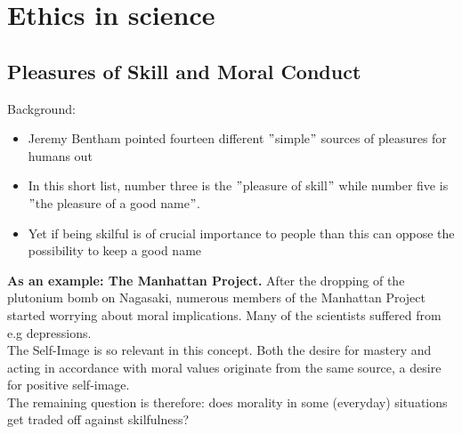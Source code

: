 

\chapter{Ethics in science}

\section{Pleasures of Skill and Moral Conduct}
Background:
\begin{itemize}
	\item Jeremy Bentham pointed fourteen different $"$simple$"$ sources of pleasures for humans out
	\item In this short list, number three is the $"$pleasure of skill$"$ while number five is $"$the pleasure of a good name$"$.
	\item Yet if being skilful is of crucial importance to people than this can oppose the possibility to keep a good name
\end{itemize}
  
  
  
\textbf{As an example: The Manhattan Project.} After the dropping of the plutonium bomb on Nagasaki, numerous members of the Manhattan Project started worrying about moral implications. Many of the scientists suffered from e.g depressions. \\ 

The Self-Image is so relevant in this concept. Both the desire for mastery and acting in accordance with moral values originate from the same source, a desire for positive self-image. \\ 

The remaining question is therefore: does morality in some (everyday) situations get traded off against skilfulness?

